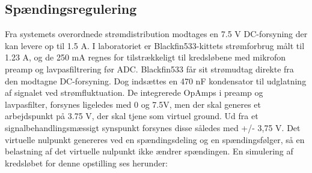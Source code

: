 
\subsection{Spændingsregulering}
Fra systemets overordnede strømdistribution modtages en 7.5 V DC-forsyning der kan levere op til 1.5 A. I laboratoriet er Blackfin533-kittets strømforbrug målt til 1.23 A, og de 250 mA regnes for tilstrækkeligt til kredsløbene med mikrofon preamp og lavpasfiltrering før ADC.
Blackfin533 får sit strømudtag direkte fra den modtagne DC-forsyning. Dog indsættes en 470 nF kondensator til udglatning af signalet ved strømfluktuation. De integrerede OpAmps i preamp og lavpasfilter, forsynes ligeledes med 0 og 7.5V, men der skal generes et arbejdspunkt på 3.75 V, der skal tjene som virtuel ground. Ud fra et signalbehandlingsmæssigt synspunkt forsynes disse således med +/- 3,75 V.
Det virtuelle nulpunkt genereres ved en spændingsdeling og en spændingsfølger, så en belastning af det virtuelle nulpunkt ikke ændrer spændingen. En simulering af kredsløbet for denne opstilling ses herunder:  



